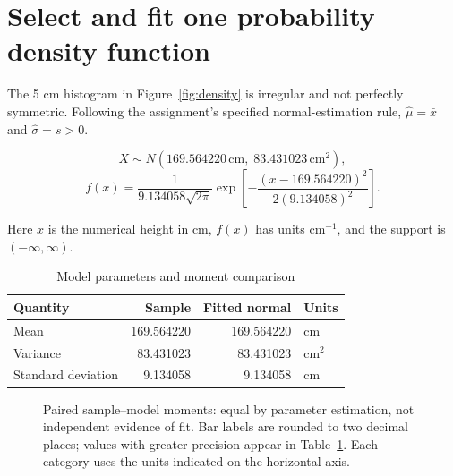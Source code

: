 \documentclass[10pt,a4paper]{article}
\newcommand{\cm}{\,\mathrm{cm}}
\begin{document}
\section{Select and fit one probability density function}
The 5 cm histogram in Figure~\ref{fig:density} is irregular and not perfectly symmetric.
	Following the assignment's specified normal-estimation rule,
	$\widehat\mu=\bar x$ and $\widehat\sigma=s>0$.
	
	\[
	X\sim N(169.564220\cm,\;83.431023\,\mathrm{cm}^2),
	\]
	\[
	f(x)=\frac{1}{9.134058\sqrt{2\pi}}
	\exp\!\left[
	-\frac{(x-169.564220)^2}{2(9.134058)^2}
	\right].
	\]
	
	Here $x$ is the numerical height in cm, $f(x)$ has units
	$\mathrm{cm}^{-1}$, and the support is $(-\infty,\infty)$.
	


	
	\begin{table}[htbp]
		\centering\small
		\caption{Model parameters and moment comparison}
		\label{tab:moments}
		\begin{tabular}{@{}lrrl@{}}
			\toprule
			Quantity & Sample & Fitted normal & Units \\
			\midrule
			Mean & 169.564220 & 169.564220 & cm \\
			Variance & 83.431023 & 83.431023 & $\mathrm{cm}^2$ \\
			Standard deviation & 9.134058 & 9.134058 & cm \\
			\bottomrule
		\end{tabular}
	\end{table}
	
	\begin{figure}[htbp]
		\centering
		\caption{Paired sample--model moments: equal by parameter
			estimation, not independent evidence of fit. Bar labels are
			rounded to two decimal places; values with greater precision
			appear in Table~\ref{tab:moments}. Each category uses the
			units indicated on the horizontal axis.}
		\label{fig:moments}
	\end{figure}
\end{document}
